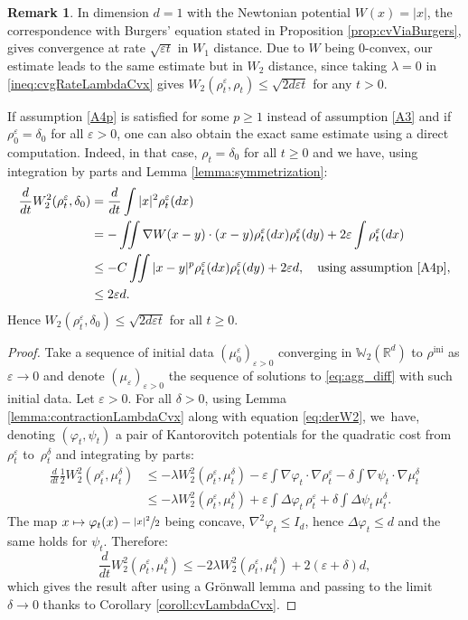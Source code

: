 \documentclass[JEP,XML,SOM,Unicode, NoFloatCountersInSection,published]{cedram}
\newcommand\mto{\mathchoice{\longmapsto}{\mapsto}{\mapsto}{\mapsto}}
\newcommand{\ini}{\mathrm{ini}}
\def\RR{\mathbb{R}}
\def\WW{\mathbb{W}}
\def\eps{\varepsilon}
\theoremstyle{plain}
\theoremstyle{definition}
\newtheorem{remark}[theorem]{Remark}
\begin{document}
\begin{remark}\label{rmk:burgers:1}
In dimension $d=1$ with the Newtonian potential $W(x) = |x|$, the correspondence with Burgers' equation stated in Proposition \ref{prop:cvViaBurgers}, gives convergence at rate $\sqrt{\eps t}$ in $W_1$ distance. Due to $W$ being $0$-convex, our estimate leads to the same estimate but in $W_2$ distance, since taking $\lambda = 0$ in \eqref{ineq:cvgRateLambdaCvx} gives $W_2(\rho_t^\eps, \rho_t) \leq \sqrt{2d\eps t}$ for any $t>0$.

If assumption \eqref{A4p} is satisfied for some $p\geq 1$ instead of assumption \eqref{A3} and if $\rho_0^\eps = \delta_0$ for all $\eps > 0$, one can also obtain the exact same estimate using a direct computation. Indeed, in that case, $\rho_t = \delta_0$ for all $t\geq 0$ and we have, using integration by parts and Lemma \ref{lemma:symmetrization}:
\begin{align*}
\frac{d}{dt} W_2^2(\rho_t^\eps, \delta_0) & = \frac{d}{dt} \int |x|^2 \rho_t^\eps(dx) \\
& = - \iint \nabla W(x-y) \cdot (x-y) \rho_t^\eps(dx) \rho_t^\eps(dy) + 2\eps \int \rho_t^\eps(dx) \\
& \leq -C\iint |x-y|^p \rho_t^\eps(dx) \rho_t^\eps(dy) + 2\eps d, \quad \text{using assumption \eqref{A4p}}, \\
& \leq 2\eps d.
\end{align*}
Hence $W_2(\rho_t^\eps, \delta_0) \leq \sqrt{2d\eps t}$ for all $t \geq 0$.
\end{remark}
\begin{proof}
Take a sequence of initial data $(\mu_0^\eps)_{\eps>0}$ converging in $\WW_2(\RR^d)$ to $\rho^{\ini}$ as $\eps \to 0$ and denote $(\mu_\eps)_{\eps >0}$ the sequence of solutions to \eqref{eq:agg_diff} with such initial data. Let $\eps >0$. For all $\delta >0$, using Lemma \ref{lemma:contractionLambdaCvx} along with equation \eqref{eq:derW2}, we~have, denoting $(\varphi_t, \psi_t)$ a pair of Kantorovitch potentials for the quadratic cost from~$\rho^\eps_t$ to~$\rho^\delta_t$ and integrating by parts:
\begin{align*}
\frac{d}{dt} \frac 12 W_2^2(\rho_t^\eps, \mu_t^\delta) &\leq -\lambda W_2^2(\rho_t^\eps, \mu_t^\delta) - \eps \int \nabla \varphi_t \cdot \nabla \rho_t^\eps - \delta \int \nabla \psi_t \cdot \nabla \mu_t^\delta \\
&\leq -\lambda W_2^2(\rho_t^\eps, \mu_t^\delta) + \eps \int \Delta \varphi_t \, \rho_t^\eps + \delta \int \Delta \psi_t \, \mu_t^\delta.
\end{align*}
The map $x \mto \varphi_t(x) - \sfrac{|x|^2}{2}$ being concave, $\nabla^2 \varphi_t \leq I_d$, hence $\Delta \varphi_t \leq d$ and the same holds for $\psi_t$. Therefore:
\[
\frac{d}{dt} W_2^2(\rho_t^\eps, \mu_t^\delta) \leq -2\lambda W_2^2(\rho_t^\eps, \mu_t^\delta) + 2(\eps + \delta)d,
\]
which gives the result after using a Grönwall lemma and passing to the limit $\delta \to 0$ thanks to Corollary \ref{coroll:cvLambdaCvx}.
\end{proof}
\end{document}
